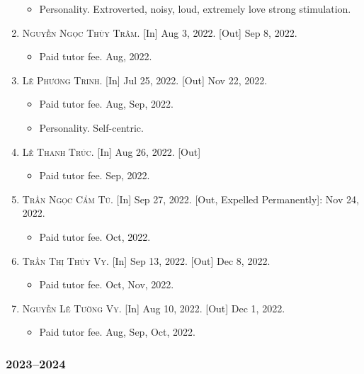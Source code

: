 \documentclass{article}
\begin{document}
\begin{enumerate}
\begin{itemize}
		\item \textsf{Personality.} Extroverted, noisy, loud, extremely love strong stimulation.
	\end{itemize}
	\item \textsc{Nguyễn Ngọc Thùy Trâm.} \textsf{[In]} Aug 3, 2022. \textsf{[Out]} Sep 8, 2022.
	\begin{itemize}
		\item \textsf{Paid tutor fee.} Aug, 2022.
	\end{itemize}
	\item \textsc{Lê Phương Trinh.} \textsf{[In]} Jul 25, 2022. \textsf{[Out]} Nov 22, 2022.
	\begin{itemize}
		\item \textsf{Paid tutor fee.} Aug, Sep, 2022.
		\item \textsf{Personality.} Self-centric.
	\end{itemize}
	\item \textsc{Lê Thanh Trúc.} \textsf{[In]} Aug 26, 2022. \textsf{[Out]}
	\begin{itemize}
		\item \textsf{Paid tutor fee.} Sep, 2022.
	\end{itemize}
	\item \textsc{Trần Ngọc Cẩm Tú.} \textsf{[In]} Sep 27, 2022. \textsf{[Out, Expelled Permanently]}: Nov 24, 2022.
	\begin{itemize}
		\item \textsf{Paid tutor fee.} Oct, 2022.
	\end{itemize}
	\item \textsc{Trần Thị Thúy Vy.} \textsf{[In]} Sep 13, 2022. \textsf{[Out]} Dec 8, 2022.
	\begin{itemize}
		\item \textsf{Paid tutor fee.} Oct, Nov, 2022.
	\end{itemize}
	\item \textsc{Nguyễn Lê Tường Vy.} \textsf{[In]} Aug 10, 2022. \textsf{[Out]} Dec 1, 2022.
	\begin{itemize}
		\item \textsf{Paid tutor fee.} Aug, Sep, Oct, 2022.
	\end{itemize}
\end{enumerate}

\subsubsection{2023--2024}

\end{document}

